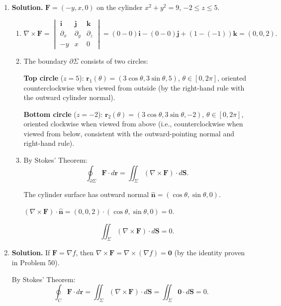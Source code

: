 \begin{enumerate}
\begin{enumerate}
\item Parameterize using $(y,z)$ or project onto a coordinate plane and integrate over the triangular region.
\end{enumerate}

\item \textbf{Solution.}
$\mathbf{F}=(-y,x,0)$ on the cylinder $x^2+y^2=9$, $-2\le z\le 5$.

\begin{enumerate}
\item
\[
\nabla\times\mathbf{F} = \begin{vmatrix}\mathbf{i}&\mathbf{j}&\mathbf{k}\\ \partial_x&\partial_y&\partial_z\\ -y&x&0\end{vmatrix} = (0-0)\mathbf{i}-(0-0)\mathbf{j}+(1-(-1))\mathbf{k} = (0,0,2).
\]

\item The boundary $\partial\Sigma$ consists of two circles:

\textbf{Top circle} ($z=5$): $\mathbf{r}_1(\theta)=(3\cos\theta, 3\sin\theta, 5)$, $\theta\in[0,2\pi]$, oriented counterclockwise when viewed from outside (by the right-hand rule with the outward cylinder normal).

\textbf{Bottom circle} ($z=-2$): $\mathbf{r}_2(\theta)=(3\cos\theta, 3\sin\theta, -2)$, $\theta\in[0,2\pi]$, oriented clockwise when viewed from above (i.e., counterclockwise when viewed from below, consistent with the outward-pointing normal and right-hand rule).

\item By Stokes' Theorem:
\[
\oint_{\partial\Sigma}\mathbf{F}\cdot d\mathbf{r} = \iint_\Sigma(\nabla\times\mathbf{F})\cdot d\mathbf{S}.
\]

The cylinder surface has outward normal $\hat{\mathbf{n}}=(\cos\theta, \sin\theta, 0)$.

$(\nabla\times\mathbf{F})\cdot\hat{\mathbf{n}} = (0,0,2)\cdot(\cos\theta,\sin\theta,0) = 0$.

\[
\boxed{\iint_\Sigma(\nabla\times\mathbf{F})\cdot d\mathbf{S} = 0.}
\]
\end{enumerate}

\item \textbf{Solution.}
If $\mathbf{F}=\nabla f$, then $\nabla\times\mathbf{F}=\nabla\times(\nabla f)=\mathbf{0}$ (by the identity proven in Problem 50).

By Stokes' Theorem:
\[
\oint_C \mathbf{F}\cdot d\mathbf{r} = \iint_\Sigma(\nabla\times\mathbf{F})\cdot d\mathbf{S} = \iint_\Sigma\mathbf{0}\cdot d\mathbf{S} = 0.
\]


\end{enumerate}
